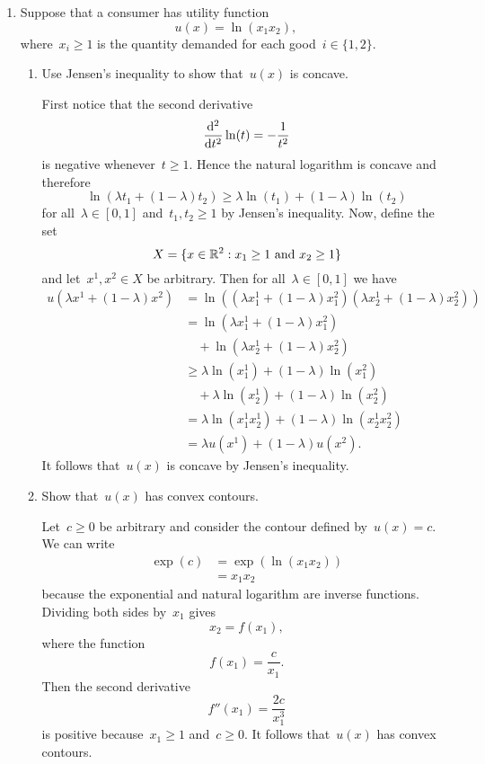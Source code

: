 
\begin{enumerate}

	\item
	Suppose that a consumer has utility function
	\[ u(x)=\ln(x_1x_2), \]
	where~$x_i\ge1$ is the quantity demanded for each good~$i\in\{1,2\}$.
	\begin{enumerate}

		\item
		Use Jensen's inequality to show that~$u(x)$ is concave.
		\begin{solution}
			First notice that the second derivative
			\[ \frac{\mathrm{d}^2}{\mathrm{d} t^2}\ln(t)=-\frac{1}{t^2} \]
			is negative whenever~$t\ge1$.
			Hence the natural logarithm is concave and therefore
			\[ \ln(\lambda t_1+(1-\lambda)t_2)%
				\ge\lambda\ln(t_1)+(1-\lambda)\ln(t_2) \]
			for all~$\lambda\in[0,1]$ and~$t_1,t_2\ge1$ by Jensen's inequality.
			Now, define the set
			\[ X=\{x\in\R^2:x_1\ge1\ \text{and}\ x_2\ge1\} \]
			and let~$x^1,x^2\in X$ be arbitrary.
			Then for all~$\lambda\in[0,1]$ we have
			\begin{align}
				u(\lambda x^1+(1-\lambda)x^2)
				&= \ln((\lambda x_1^1+(1-\lambda)x_1^2)%
					(\lambda x_2^1+(1-\lambda)x_2^2))\\
				&= \ln(\lambda x_1^1+(1-\lambda)x_1^2)\\
					&\quad+\ln(\lambda x_2^1+(1-\lambda)x_2^2)\\
				&\ge \lambda\ln(x_1^1)+(1-\lambda)\ln(x_1^2)\\
					&\quad+\lambda\ln(x_2^1)+(1-\lambda)\ln(x_2^2)\\
				&= \lambda\ln(x_1^1x_2^1)+(1-\lambda)\ln(x_2^1x_2^2)\\
				&= \lambda u(x^1)+(1-\lambda)u(x^2).
			\end{align}
			It follows that~$u(x)$ is concave by Jensen's inequality.
		\end{solution}

		\item
		Show that~$u(x)$ has convex contours.
		\begin{solution}
			Let~$c\ge0$ be arbitrary and consider the contour defined by~$u(x)=c$.
			We can write
			\begin{align}
				\exp(c)
				&= \exp(\ln(x_1x_2))\\
				&= x_1x_2
			\end{align}
			because the exponential and natural logarithm are inverse functions.
			Dividing both sides by~$x_1$ gives
			\[ x_2=f(x_1), \]
			where the function
			\[ f(x_1)=\frac{c}{x_1}. \]
			Then the second derivative
			\[ f''(x_1)=\frac{2c}{x_1^3} \]
			is positive because~$x_1\ge1$ and~$c\ge0$.
			It follows that~$u(x)$ has convex contours.
		\end{solution}


\end{enumerate}
\end{enumerate}
